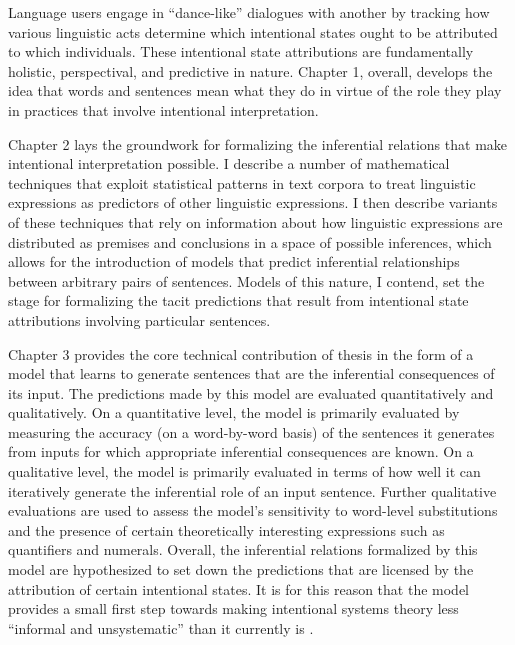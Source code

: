 Language users engage in ``dance-like'' dialogues with another by tracking how various linguistic acts determine which intentional states ought to be attributed to which individuals. These intentional state attributions are fundamentally holistic, perspectival, and predictive in nature. Chapter 1, overall, develops the idea that words and sentences mean what they do in virtue of the role they play in practices that involve intentional interpretation.

Chapter 2 lays the groundwork for formalizing the inferential relations that make intentional interpretation possible. I describe a number of mathematical techniques that exploit statistical patterns in text corpora to treat linguistic expressions as predictors of other linguistic expressions. I then describe variants of these techniques that rely on information about how linguistic expressions are distributed as premises and conclusions in a space of possible inferences, which allows for the introduction of models that predict inferential relationships between arbitrary pairs of sentences. Models of this nature, I contend, set the stage for formalizing the tacit predictions that result from intentional state attributions involving particular sentences. 

Chapter 3 provides the core technical contribution of thesis in the form of a model that learns to generate sentences that are the inferential consequences of its input. The predictions made by this model are evaluated quantitatively and qualitatively. On a quantitative level, the model is primarily evaluated by measuring the accuracy (on a word-by-word basis) of the sentences it generates from inputs for which appropriate inferential consequences are known. On a qualitative level, the model is primarily evaluated in terms of how well it can iteratively generate the inferential role of an input sentence. Further qualitative evaluations are used to assess the model's sensitivity to word-level substitutions and the presence of certain theoretically interesting expressions such as quantifiers and numerals. Overall, the inferential relations formalized by this model are hypothesized to set down the predictions that are licensed by the attribution of certain intentional states. It is for this reason that the model provides a small first step towards making intentional systems theory less ``informal and unsystematic'' than it currently is \citep[][p. 67]{Dennett:1987}.

